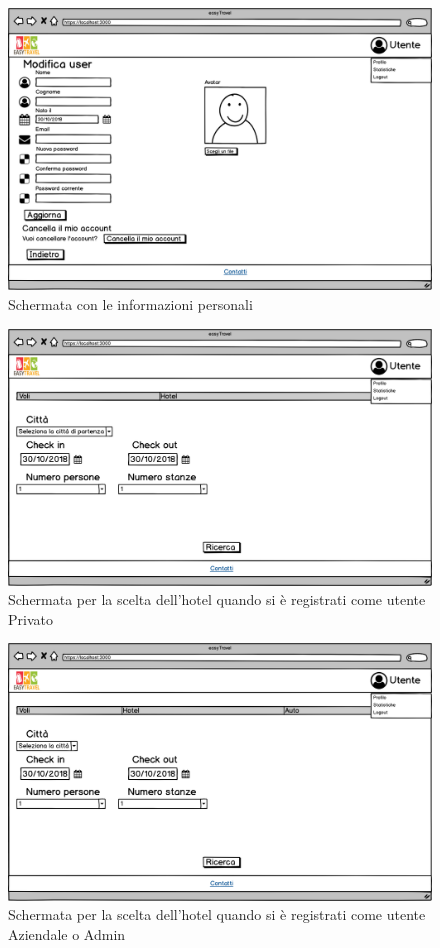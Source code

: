 \documentclass[11pt]{article}
\begin{document}
\begin{figure}[!ht]
	\includegraphics[width=1\textwidth]{./Mockup/Profilo-user-aziendale} %
	\caption{Schermata con le informazioni personali}
	\label{fig:profiloutente}
\end{figure}

\begin{figure}[!ht]
	\includegraphics[width=1\textwidth]{./Mockup/Hotel-user} %
	\caption{Schermata per la scelta dell'hotel quando si è registrati come utente Privato}
	\label{fig:hoteluser}
\end{figure}

\begin{figure}[!ht]
	\includegraphics[width=1\textwidth]{./Mockup/Hotel-aziendale-admin} %
	\caption{Schermata per la scelta dell'hotel quando si è registrati come utente Aziendale o Admin}
	\label{fig:hotelaziendaleadmin}
\end{figure}
\end{document}
